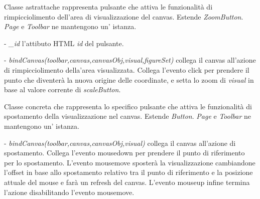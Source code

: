 Classe astrattache rappresenta pulsante che attiva le funzionalit\` a di rimpicciolimento dell'area di visualizzazione del canvas.
Estende \textit{ZoomButton}.
\textit{Page} e \textit{Toolbar} ne mantengono un' istanza.
\begin{elencopuntato}[\subsubsecindent]
\item[-] \textit{{\_}id} l'attibuto HTML \textit{id} del pulsante.
\end{elencopuntato}
\begin{elencopuntato}[\subsubsecindent]
\item[-] \textit{bindCanvas(toolbar,canvas,canvasObj,visual,figureSet)} collega il canvas all'azione di rimpicciolimento della'area visualizzata. Collega l'evento click per prendere il punto che diventer\`a la nuova origine delle coordinate, e setta lo zoom di \textit{visual} in base al valore corrente di \textit{scaleButton}.
\end{elencopuntato}

Classe concreta che rappresenta lo specifico pulsante che attiva le funzionalit\` a di spostamento della visualizzazione nel canvas.
Estende \textit{Button}.
\textit{Page} e \textit{Toolbar} ne mantengono un' istanza.
\begin{elencopuntato}[\subsubsecindent]
\item[-] \textit{bindCanvas(toolbar,canvas,canvasObj,visual)} collega il canvas all'azione di spostamento. Collega l'evento mousedown per prendere il punto di riferimento per lo spostamento. L'evento mousemove sposter\`a la visualizzazione cambiandone l'offset in base allo spostamento relativo tra il punto di riferimento e la posizione attuale del mouse e far\`a un refresh del canvas. L'evento mouseup infine termina l'azione disabilitando l'evento mousemove.
\end{elencopuntato}

